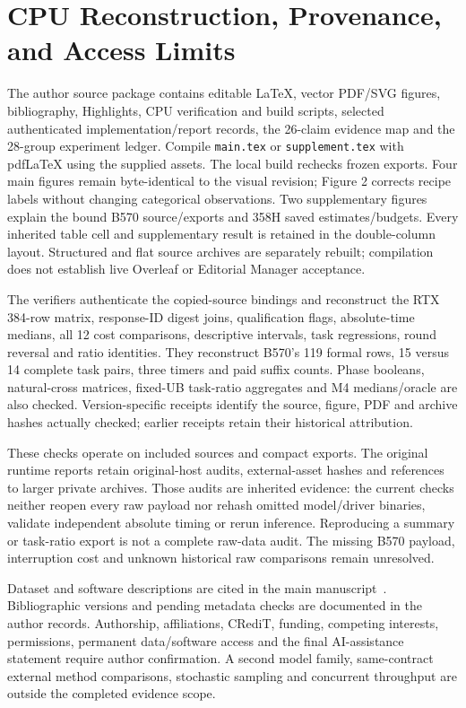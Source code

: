 \section{CPU Reconstruction, Provenance, and Access Limits}
\label{supp:reproducibility}
The author source package contains editable LaTeX, vector PDF/SVG figures, bibliography, Highlights, CPU verification and build scripts, selected authenticated implementation/report records, the 26-claim evidence map and the 28-group experiment ledger. Compile \texttt{main.tex} or \texttt{supplement.tex} with pdfLaTeX using the supplied assets. The local build rechecks frozen exports. Four main figures remain byte-identical to the visual revision; Figure 2 corrects recipe labels without changing categorical observations. Two supplementary figures explain the bound B570 source/exports and 358H saved estimates/budgets. Every inherited table cell and supplementary result is retained in the double-column layout. Structured and flat source archives are separately rebuilt; compilation does not establish live Overleaf or Editorial Manager acceptance.

The verifiers authenticate the copied-source bindings and reconstruct the RTX 384-row matrix, response-ID digest joins, qualification flags, absolute-time medians, all 12 cost comparisons, descriptive intervals, task regressions, round reversal and ratio identities. They reconstruct B570's 119 formal rows, 15 versus 14 complete task pairs, three timers and paid suffix counts. Phase booleans, natural-cross matrices, fixed-UB task-ratio aggregates and M4 medians/oracle are also checked. Version-specific receipts identify the source, figure, PDF and archive hashes actually checked; earlier receipts retain their historical attribution.

These checks operate on included sources and compact exports. The original runtime reports retain original-host audits, external-asset hashes and references to larger private archives. Those audits are inherited evidence: the current checks neither reopen every raw payload nor rehash omitted model/driver binaries, validate independent absolute timing or rerun inference. Reproducing a summary or task-ratio export is not a complete raw-data audit. The missing B570 payload, interruption cost and unknown historical raw comparisons remain unresolved.

Dataset and software descriptions are cited in the main manuscript~\cite{humaneval,mbpp,specbench,llamacpp,qwen3}. Bibliographic versions and pending metadata checks are documented in the author records. Authorship, affiliations, CRediT, funding, competing interests, permissions, permanent data/software access and the final AI-assistance statement require author confirmation. A second model family, same-contract external method comparisons, stochastic sampling and concurrent throughput are outside the completed evidence scope.
